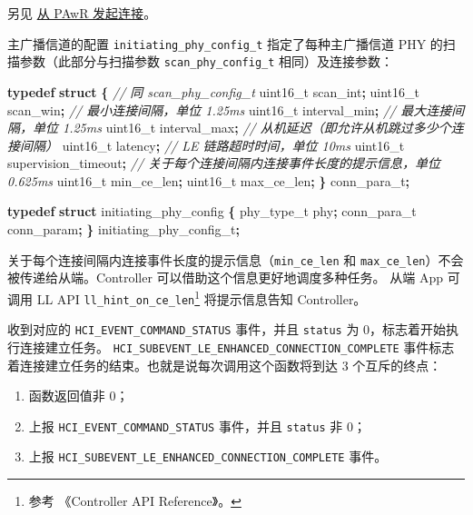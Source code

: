 \documentclass[
  12pt,
]{book}
\newenvironment{Shaded}{\begin{snugshade}}{\end{snugshade}}
\newcommand{\CommentTok}[1]{\textcolor[rgb]{0.56,0.35,0.01}{\textit{#1}}}
\newcommand{\DataTypeTok}[1]{\textcolor[rgb]{0.13,0.29,0.53}{#1}}
\newcommand{\KeywordTok}[1]{\textcolor[rgb]{0.13,0.29,0.53}{\textbf{#1}}}
\newcommand{\NormalTok}[1]{#1}
\newcommand{\OperatorTok}[1]{\textcolor[rgb]{0.81,0.36,0.00}{\textbf{#1}}}
\providecommand{\tightlist}{%
  \setlength{\itemsep}{0pt}\setlength{\parskip}{0pt}}
\begin{document}
另见 \protect\hyperlink{ch-adv-create-connection}{从 PAwR 发起连接}。

主广播信道的配置 \texttt{initiating\_phy\_config\_t} 指定了每种主广播信道 PHY 的扫描参数（此部分与扫描参数 \texttt{scan\_phy\_config\_t} 相同）及连接参数：

\begin{Shaded}
\begin{Highlighting}[]
\KeywordTok{typedef} \KeywordTok{struct} \OperatorTok{\{}
    \CommentTok{// 同 scan\_phy\_config\_t}
    \DataTypeTok{uint16\_t}\NormalTok{ scan\_int}\OperatorTok{;}
    \DataTypeTok{uint16\_t}\NormalTok{ scan\_win}\OperatorTok{;}
    \CommentTok{// 最小连接间隔，单位 1.25ms}
    \DataTypeTok{uint16\_t}\NormalTok{ interval\_min}\OperatorTok{;}
    \CommentTok{// 最大连接间隔，单位 1.25ms}
    \DataTypeTok{uint16\_t}\NormalTok{ interval\_max}\OperatorTok{;}
    \CommentTok{// 从机延迟（即允许从机跳过多少个连接间隔）}
    \DataTypeTok{uint16\_t}\NormalTok{ latency}\OperatorTok{;}
    \CommentTok{// LE 链路超时时间，单位 10ms}
    \DataTypeTok{uint16\_t}\NormalTok{ supervision\_timeout}\OperatorTok{;}
    \CommentTok{// 关于每个连接间隔内连接事件长度的提示信息，单位 0.625ms}
    \DataTypeTok{uint16\_t}\NormalTok{ min\_ce\_len}\OperatorTok{;}
    \DataTypeTok{uint16\_t}\NormalTok{ max\_ce\_len}\OperatorTok{;}
\OperatorTok{\}}\NormalTok{ conn\_para\_t}\OperatorTok{;}

\KeywordTok{typedef} \KeywordTok{struct}\NormalTok{ initiating\_phy\_config}
\OperatorTok{\{}
\NormalTok{    phy\_type\_t phy}\OperatorTok{;}
\NormalTok{    conn\_para\_t conn\_param}\OperatorTok{;}
\OperatorTok{\}}\NormalTok{ initiating\_phy\_config\_t}\OperatorTok{;}
\end{Highlighting}
\end{Shaded}

关于每个连接间隔内连接事件长度的提示信息（\texttt{min\_ce\_len} 和 \texttt{max\_ce\_len}）不会被传递给从端。Controller 可以借助这个信息更好地调度多种任务。
从端 App 可调用 LL API \texttt{ll\_hint\_on\_ce\_len}\footnote{参考 《Controller API Reference》。} 将提示信息告知 Controller。

收到对应的 \texttt{HCI\_EVENT\_COMMAND\_STATUS} 事件，并且 \texttt{status} 为 \(0\)，标志着开始执行连接建立任务。
\texttt{HCI\_SUBEVENT\_LE\_ENHANCED\_CONNECTION\_COMPLETE} 事件标志着连接建立任务的结束。也就是说每次调用这个函数将到达 3 个互斥的终点：

\begin{enumerate}
\def\labelenumi{\arabic{enumi}.}
\tightlist
\item
  函数返回值非 \(0\)；
\item
  上报 \texttt{HCI\_EVENT\_COMMAND\_STATUS} 事件，并且 \texttt{status} 非 \(0\)；
\item
  上报 \texttt{HCI\_SUBEVENT\_LE\_ENHANCED\_CONNECTION\_COMPLETE} 事件。
\end{enumerate}
\end{document}
